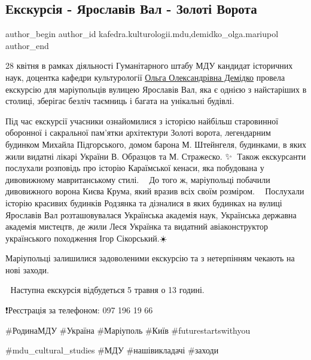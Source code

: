  
 
 
 
 

\subsection{Екскурсія - Ярославів Вал - Золоті Ворота}
\label{sec:29_04_2023.fb.kafedra.kulturologii.mdu.1.ekskursia_jaroslaviv_val_zoloti_vorota}
 
\ifcmt
 author_begin
   author_id kafedra.kulturologii.mdu,demidko_olga.mariupol
 author_end
\fi

28 квітня в рамках діяльності Гуманітарного штабу МДУ кандидат історичних наук,
доцентка кафедри культурології \href{\urlDemidkoIA}{Ольга Олександрівна Демідко} провела екскурсію для маріупольців
вулицею Ярославів Вал, яка є однією з найстаріших в столиці, зберігає безліч
таємниць і багата на унікальні будівлі. 🏰💓 

Під час екскурсії учасники ознайомилися з історією найбільш старовинної
оборонної і сакральної пам'ятки архітектури Золоті ворота, легендарним будинком
Михайла Підгорського, домом барона М. Штейнгеля,  будинками, в яких жили
видатні лікарі України В. Образцов та М. Стражеско. ✨️🤩 Також екскурсанти
послухали розповідь про історію Караїмської кенаси, яка побудована у
дивовижному мавританському стилі. 🕍😊 До того ж, маріупольці побачили
дивовижного ворона Києва Крума, який вразив всіх своїм розміром. 💝🦅 Послухали
історію красивих будинків Родзянка та дізналися в яких будинках на вулиці
Ярославів Вал розташовувалася Українська академія наук, Українська державна
академія мистецтв, де жили Леся Українка та видатний авіаконструктор
українського походження Ігор Сікорський.☀️🤗 

Маріупольці залишилися задоволеними екскурсію та з нетерпінням чекають на нові заходи. 

🥰 Наступна екскурсія відбудеться 5 травня о 13 годині. 

❗️Реєстрація за телефоном: 097 196 19 66 

\#РодинаМДУ  \#Україна \#Маріуполь \#Київ  \#futurestartswithyou  

\#mdu\_cultural\_studies \#МДУ  \#нашівикладачі \#заходи
